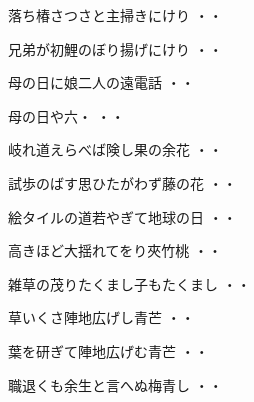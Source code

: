 \begin{shiika}落ち椿さつさと主掃きにけり
\hfill{・・}\end{shiika}
\vspace{0.6cm}
\begin{shiika}兄弟が初鯉のぼり揚げにけり
\hfill{・・}\end{shiika}
\vspace{0.6cm}
\begin{shiika}母の日に娘二人の遠電話
\hfill{・・}\end{shiika}
\vspace{0.6cm}
\begin{shiika}母の日や六・
\hfill{・・}\end{shiika}
\vspace{0.6cm}
\begin{shiika}岐れ道えらべば険し果の余花
\hfill{・・}\end{shiika}
\vspace{0.6cm}
\begin{shiika}試歩のばす思ひたがわず藤の花
\hfill{・・}\end{shiika}
\vspace{0.6cm}
\begin{shiika}絵タイルの道若やぎて地球の日
\hfill{・・}\end{shiika}
\vspace{0.6cm}
\begin{shiika}高きほど大揺れてをり夾竹桃
\hfill{・・}\end{shiika}
\vspace{0.6cm}
\begin{shiika}雑草の茂りたくまし子もたくまし
\hfill{・・}\end{shiika}
\vspace{0.6cm}
\begin{shiika}草いくさ陣地広げし青芒
\hfill{・・}\end{shiika}
\vspace{0.6cm}
\begin{shiika}葉を研ぎて陣地広げむ青芒
\hfill{・・}\end{shiika}
\vspace{0.6cm}
\begin{shiika}職退くも余生と言へぬ梅青し
\hfill{・・}\end{shiika}
